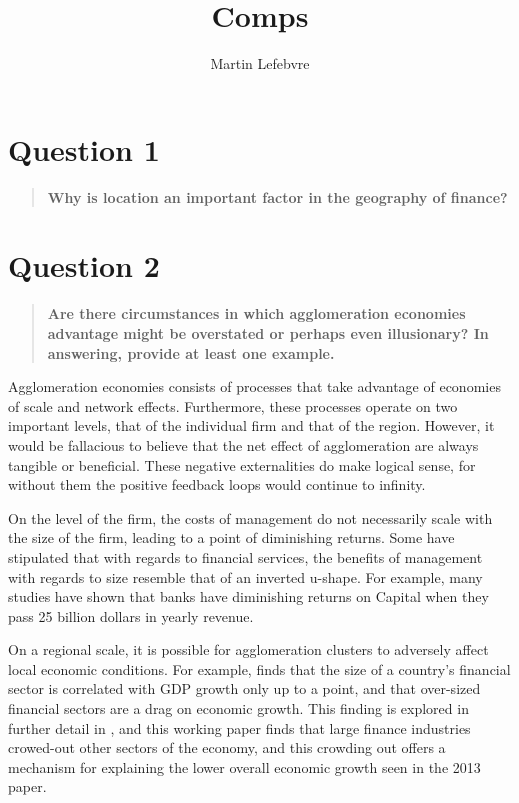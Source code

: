 \documentclass[12pt,letterpaper,notitlepage,onecolumn,final,openbib]{article}
\author{Martin Lefebvre}
\title{Comps}
\begin{document}
 
	
\section{Question 1}
\begin{quotation}
	\textbf{Why is location an important factor in the geography of finance?}
\end{quotation}



\section{Question 2}
\begin{quotation}
	\textbf{Are there circumstances in which agglomeration economies advantage might be overstated or perhaps even illusionary? In answering, provide at least one example.}
\end{quotation}

Agglomeration economies consists of processes that take advantage of economies of scale and network effects.  Furthermore, these processes operate on two important levels, that of the individual firm and that of the region.  However, it would be fallacious to believe that the net effect of agglomeration are always tangible or beneficial.   These negative externalities do make logical sense, for without them the positive feedback loops would continue to infinity. 


On the level of the firm, the costs of management do not necessarily scale with the size of the firm, leading to a point of diminishing returns.  Some \cite{Smith2010} have stipulated that with regards to financial services, the benefits of management with regards to size resemble that of an inverted u-shape.  For example, many studies have shown that banks have diminishing returns on Capital when they pass 25 billion dollars in yearly revenue.  \cite{Yves2010_Myths} 


On a regional scale, it is possible for agglomeration clusters to adversely affect local economic conditions.  For example,  finds that the size of a country's financial sector is correlated with GDP growth only up to a point, and that over-sized financial sectors are a drag on economic growth.  This finding is explored in further detail in , and this working paper finds that large finance industries crowed-out other sectors of the economy, and this crowding out offers a mechanism for explaining the lower overall economic growth seen in the 2013 paper. 
%
\end{document}
